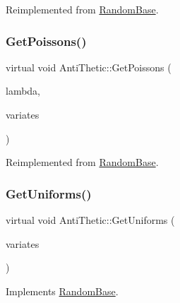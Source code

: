 Reimplemented from \hyperlink{classRandomBase_a734f1712b1179fb31380e04da4a27f20}{Random\+Base}.

\hypertarget{classAntiThetic_af37fd70c21d1d4bf65a0494a4a8c5459}{}\label{classAntiThetic_af37fd70c21d1d4bf65a0494a4a8c5459} 
\subsubsection{\texorpdfstring{Get\+Poissons()}{GetPoissons()}}
{\footnotesize\ttfamily virtual void Anti\+Thetic\+::\+Get\+Poissons (\begin{DoxyParamCaption}\item[{double}]{lambda,  }\item[{\hyperlink{classMJArray}{M\+J\+Array} \&}]{variates }\end{DoxyParamCaption})\hspace{0.3cm}{\ttfamily [virtual]}}



Reimplemented from \hyperlink{classRandomBase_aa2e79f1f4c55c36df9c701d29e9b08a5}{Random\+Base}.

\hypertarget{classAntiThetic_affc5dff1f5783cb68f3933dd7b25c83a}{}\label{classAntiThetic_affc5dff1f5783cb68f3933dd7b25c83a} 
\subsubsection{\texorpdfstring{Get\+Uniforms()}{GetUniforms()}\hspace{0.1cm}{\footnotesize\ttfamily [1/2]}}
{\footnotesize\ttfamily virtual void Anti\+Thetic\+::\+Get\+Uniforms (\begin{DoxyParamCaption}\item[{\hyperlink{classMJArray}{M\+J\+Array} \&}]{variates }\end{DoxyParamCaption})\hspace{0.3cm}{\ttfamily [virtual]}}



Implements \hyperlink{classRandomBase_aa061fb77f53969f6fbe40c7454c69eb9}{Random\+Base}.

\hypertarget{classAntiThetic_a189ea07e81121c1ae4f3c655ec405487}{}\label{classAntiThetic_a189ea07e81121c1ae4f3c655ec405487} 
